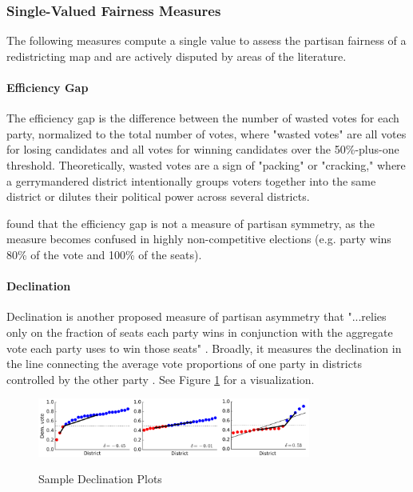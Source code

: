 \subsubsection{Single-Valued Fairness Measures}

The following measures compute a single value to assess the partisan fairness of a redistricting map and are actively disputed by areas of the literature.

\paragraph{Efficiency Gap}
\label{sec:effgap}

The efficiency gap is the difference between the number of wasted votes for each party, normalized to the total number of votes, where "wasted votes" are all votes for losing candidates and all votes for winning candidates over the 50\%-plus-one threshold. Theoretically, wasted votes are a sign of "packing" or "cracking," where a gerrymandered district intentionally groups voters together into the same district or dilutes their political power across several districts. \parencite{stephanopoulos2015}

\textcite{veomett2018} found that the efficiency gap is not a measure of partisan symmetry, as the measure becomes confused in highly non-competitive elections (e.g. party wins 80\% of the vote and 100\% of the seats). 

\paragraph{Declination}
\label{sec:declination}

Declination is another proposed measure of partisan asymmetry that "...relies only on the fraction of seats each party wins in conjunction with the aggregate vote each party uses to win those seats" \parencite[3]{warrington2018}. Broadly, it measures the declination in the line connecting the average vote proportions of one party in districts controlled by the other party \parencite{warrington2018}. See Figure \ref{fig:dec} for a visualization. 

\begin{figure}[b]
    \caption{Sample Declination Plots}
    \includegraphics[width=0.8\textwidth]{img/dec.PNG}
    \label{fig:dec}
    \raggedright
\end{figure}

